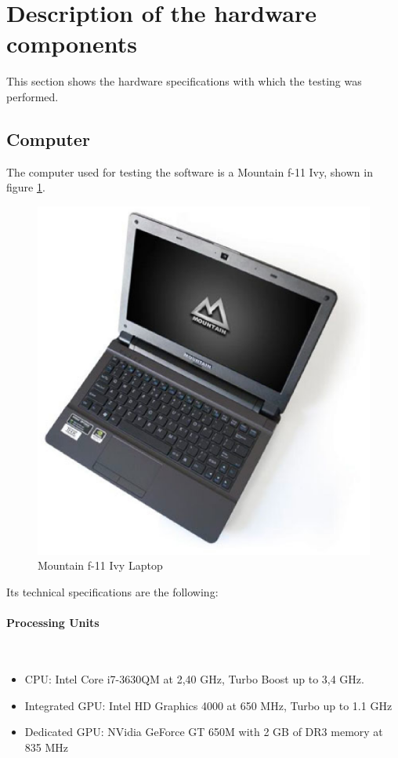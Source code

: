 \section{Description of the hardware components}
This section shows the hardware specifications with which the testing was performed. 

\subsection{Computer}
	The computer used for testing the software is a Mountain f-11 Ivy, shown in figure \ref{laptop}.

	\begin{figure}[H]
		\begin{center}
	\includegraphics[scale=0.3]{img/mountain.eps}
		\caption[Mountain laptop]{Mountain f-11 Ivy Laptop}
		\end{center}
		\label{laptop}
	\end{figure}

	Its technical specifications are the following: 

	\paragraph{Processing Units} \mbox{}\\
		\begin{itemize}
			\item{CPU: Intel Core i7-3630QM at 2,40 GHz, Turbo Boost up to 3,4 GHz.}
			\item{Integrated GPU:  Intel HD Graphics 4000 at 650 MHz,  Turbo up to 1.1 GHz }
			\item{Dedicated GPU: NVidia GeForce GT 650M with 2 GB of DR3 memory at 835 MHz }
		\end{itemize}

